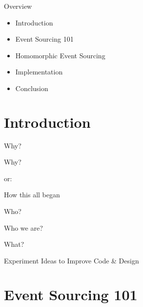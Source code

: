 \begin{frame}[fragile]{Overview}

\begin{itemize}
\item Introduction
\item Event Sourcing 101
\item Homomorphic Event Sourcing
\item Implementation
\item Conclusion
\end{itemize}

\end{frame}

\section{Introduction}

\begin{frame}[fragile]{Why?}

\begin{center}
{
\LARGE
Why?
}

\vspace{2em}

or:

\vspace{2em}

{
\Large
How this all began
}
\end{center}
\end{frame}


\begin{frame}[fragile]{Who?}

\begin{center}
{
\LARGE
Who we are?
}

\vspace{2em}
\end{center}
\end{frame}


\begin{frame}[fragile]{What?}

\begin{center}
{
\LARGE
Experiment Ideas to Improve Code \& Design
}

\vspace{2em}
\end{center}
\end{frame}

\section{Event Sourcing 101}

